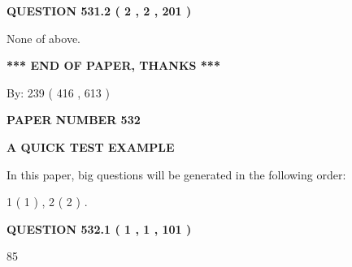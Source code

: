\documentclass[12pt]{article}
\begin{document}
{\textbf{\Large{QUESTION
531.2 
 ( 2 , 2 , 201 )
}}}
  
  
 
 
\noindent{}
 
 
 None of above.
 
 
 
 
   
   
 \vspace{0.2in}
 
   
   
   
   
\vspace{1.0in} 
{\textbf{\large{ *** END OF PAPER, THANKS *** }}} 
   
   
\hspace{1.0in} By: 
 239 ( 416 ,  613 )
   
   
   
   
\newpage 
\setcounter{page}{ 
   532001 } 
   
   
   
   
 {\textbf{ \Large{ PAPER NUMBER  532  }}}
   
   
\vspace{0.2in}
   
   
   
   
   
   
 \vspace{0.2in}
{\LARGE {\textbf{ A QUICK TEST EXAMPLE}}}
   
   
   
\vspace{0.2in}
   
In this paper, big questions will be generated in the following order: 
   
   
   1 ( 1 )
 ,
   2 ( 2 )
 .
  
\vspace{0.2in}
  
{\textbf{\Large{QUESTION
532.1 
 ( 1 , 1 , 101 )
}}}
  
  
 
 
\noindent{}

85
 
 
 
 
\noindent{}
\end{document}
